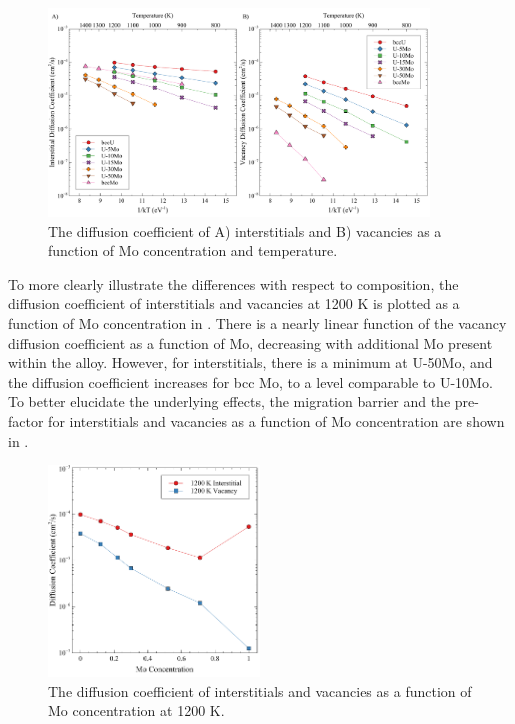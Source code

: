 \documentclass[review]{elsarticle}
\begin{document}
\begin{figure}[h!]
    \centering
    \includegraphics[width=0.9\textwidth]{diff_p0.pdf}
    \caption{The diffusion coefficient of A) interstitials and B) vacancies as a function of Mo concentration and temperature.}
    \label{fig:diff_p0}
\end{figure}

To more clearly illustrate the differences with respect to composition, the diffusion coefficient of interstitials and vacancies at 1200 K is plotted as a function of Mo concentration in . There is a nearly linear function of the vacancy diffusion coefficient as a function of Mo, decreasing with additional Mo present within the alloy. However, for interstitials, there is a minimum at U-50Mo, and the diffusion coefficient increases for bcc Mo, to a level comparable to U-10Mo. To better elucidate the underlying effects, the migration barrier and the pre-factor for interstitials and vacancies as a function of Mo concentration are shown in . 

\begin{figure}[h]
    \centering
    \includegraphics[width=0.5\textwidth]{1200K_diff.pdf}
    \caption{The diffusion coefficient of interstitials and vacancies as a function of Mo concentration at 1200 K.}
    \label{fig:1200K_diff}
\end{figure}
\end{document}
